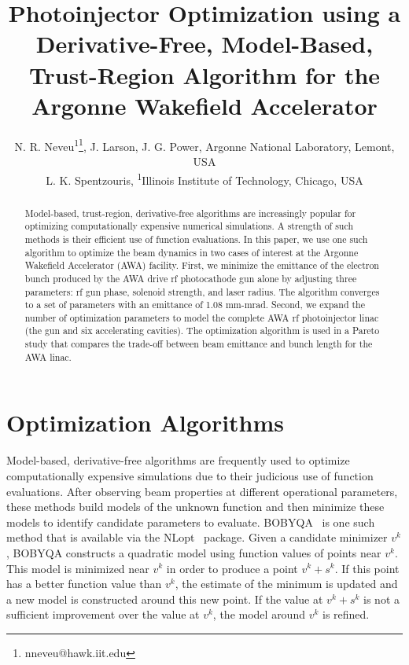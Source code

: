 \documentclass[letterpaper,  %
              ]{jacow}
\begin{document}
\title{Photoinjector Optimization using a Derivative-Free, Model-Based, 
	Trust-Region Algorithm for the Argonne Wakefield Accelerator } 
	

\author{N. R. Neveu\textsuperscript{1}\thanks{nneveu@hawk.iit.edu}, J. Larson, J. G. Power, Argonne National Laboratory, Lemont, USA \\
		L. K. Spentzouris, \textsuperscript{1}Illinois Institute of Technology, Chicago, USA}
	
\maketitle

%
\begin{abstract}
Model-based, trust-region, derivative-free algorithms 
are increasingly popular for optimizing computationally 
expensive numerical simulations. A strength of such
methods is their efficient use of function evaluations. 
In this paper, we use one such algorithm to optimize 
the beam dynamics in two cases of interest at the 
Argonne Wakefield Accelerator (AWA) facility. 
First, we minimize the emittance of the electron 
bunch produced by the AWA drive rf photocathode gun 
alone by adjusting three parameters: rf gun phase, 
solenoid strength, and laser radius. The algorithm 
converges to a set of parameters with an
emittance of 1.08 mm-mrad. Second, we expand 
the number of optimization parameters to model 
the complete AWA rf photoinjector linac 
(the gun and six accelerating cavities). 
The optimization algorithm is used in a Pareto study that compares the 
trade-off between beam emittance and bunch 
length for the AWA linac.
\end{abstract}


\section{Optimization Algorithms}
Model-based, derivative-free algorithms are frequently used to optimize
computationally expensive simulations due to their judicious use of function
evaluations. After observing beam properties at
different operational parameters, these methods build models of the unknown
function and then minimize these models to identify candidate parameters to 
evaluate. BOBYQA~\cite{bobyqa} is one such method that is available via the
NLopt~\cite{nlopt} package. Given a candidate minimizer $v^k$, BOBYQA
constructs a quadratic model using function values of points near $v^k$. This
model is minimized near $v^k$ in order to produce a point $v^k + s^k$. If this
point has a better function value than $v^k$, the estimate of the minimum is
updated and a new model is constructed around this new point. If the value at
$v^k + s^k$ is not a sufficient improvement over the value at $v^k$, the model
around $v^k$ is refined.
\end{document}
